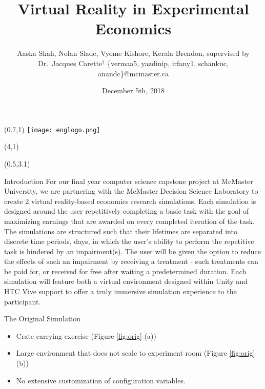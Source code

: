 \documentclass[22pt]{beamer}
\title{Virtual Reality in Experimental Economics}
\subtitle{}  %
\author[Shah, Slade, Kishore, Brendon \& Carette]{Aaska Shah, Nolan Slade, Vyome Kishore, Kerala Brendon, supervised by Dr.~Jacques Carette$^\dagger$ \vspace{0.3cm} \newline \small \{vermaa5, yazdinip, irfany1, schankuc, anandc\}@mcmaster.ca}
\institute[McMaster University]{$^\dagger$Department of Computing and Software, McMaster University

1280 Main St. W, Hamilton, Ontario, Canada L8S 4L8}
\date{December 5th, 2018}
\begin{document}

\begin{frame}[fragile]

\begin{textblock}{2}(0.7,1)
\texttt{[image: englogo.png]} %
\end{textblock}

\begin{textblock}{8}(4,1)
\titlepage
\end{textblock}

\begin{textblock}{7.25}(0.5,3.1)

\begin{block}{Introduction}
For our final year computer science capstone project at McMaster University, we are partnering with the McMaster Decision Science Laboratory to create 2 virtual reality-based economics research simulations. Each simulation is designed
around the user repetitively completing a basic task with the goal of maximizing
earnings that are awarded on every completed iteration of the task. The
simulations are structured such that their lifetimes are separated into discrete
time periods, days, in which the user’s ability to perform the repetitive task is
hindered by an impairment(s). The user will be given the option to reduce the
effects of such an impairment by receiving a treatment - such treatments can be
paid for, or received for free after waiting a predetermined duration. Each simulation will feature both a virtual environment designed within Unity
and HTC Vive support to offer a truly immersive simulation experience to the
participant.

\end{block}

\begin{block}{The Original Simulation}
\begin{itemize}
\item Crate carrying exercise (Figure \ref{fig:orig} (a))
\item Large environment that does not scale to experiment room (Figure \ref{fig:orig} (b))
\item No extensive customization of configuration variables.
\end{itemize}


\end{block}
\end{textblock}
\end{frame}
\end{document}
